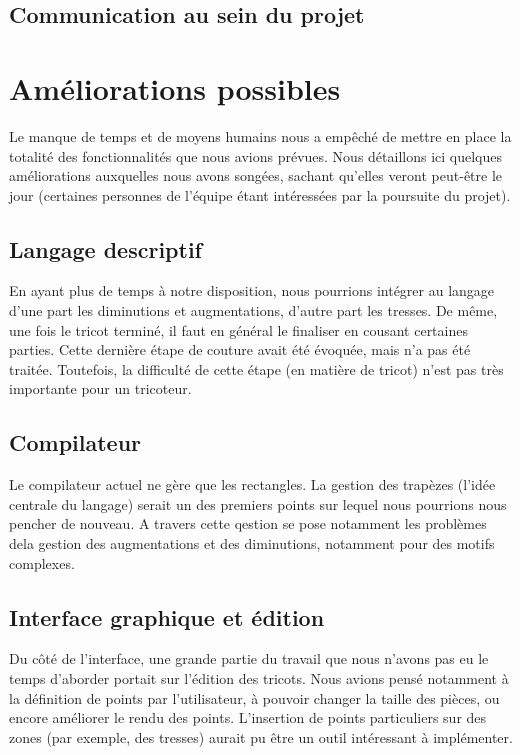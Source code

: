 \documentclass{article}
\begin{document}

\subsection{Communication au sein du projet}

\section{Améliorations possibles}

Le manque de temps et de moyens humains nous a empêché de mettre en
place la totalité des fonctionnalités que nous avions prévues. Nous détaillons
ici quelques améliorations auxquelles nous avons songées, sachant qu'elles veront
peut-être le jour (certaines personnes de l'équipe étant intéressées par la 
poursuite du projet).

\subsection{Langage descriptif}

En ayant plus de temps à notre disposition, nous pourrions intégrer au
langage d'une part les diminutions et augmentations, d'autre part les
tresses. De même, une fois le tricot terminé, il faut en général le
finaliser en cousant certaines parties. Cette dernière étape de
couture avait été évoquée, mais n'a pas été traitée. Toutefois, la
difficulté de cette étape (en matière de tricot) n'est pas très
importante pour un tricoteur.

\subsection{Compilateur}

Le compilateur actuel ne gère que les rectangles. La gestion des trapèzes 
(l'idée centrale du langage) serait un des premiers points sur lequel nous
pourrions nous pencher de nouveau. A travers cette qestion se pose notamment
les problèmes dela gestion des augmentations et des diminutions, notamment pour
des motifs complexes.

\subsection{Interface graphique et édition}

Du côté de l'interface, une grande partie du travail que nous n'avons
pas eu le temps d'aborder portait sur l'édition des tricots. Nous
avions pensé notamment à la définition de points par l'utilisateur, à
pouvoir changer la taille des pièces, ou encore améliorer le rendu des
points. L'insertion de points particuliers sur des zones (par exemple,
des tresses) aurait pu être un outil intéressant à implémenter.
\end{document}
